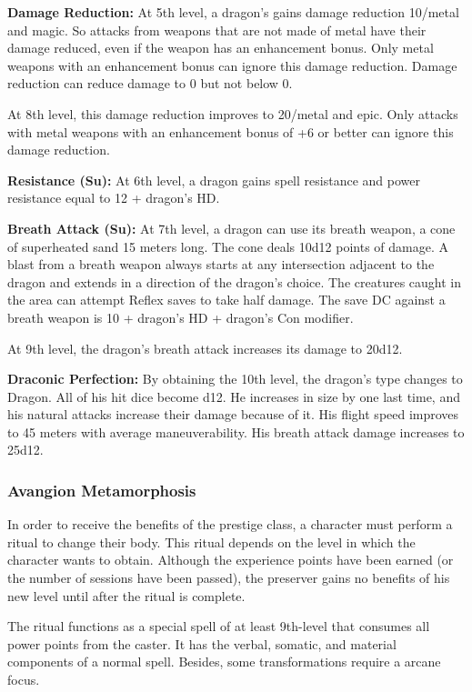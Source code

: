 {\textbf{Damage Reduction:} At 5th level, a dragon's gains damage reduction 10/metal and magic. So attacks from weapons that are not made of metal have their damage reduced, even if the weapon has an enhancement bonus. Only metal weapons with an enhancement bonus can ignore this damage reduction. Damage reduction can reduce damage to 0 but not below 0.

At 8th level, this damage reduction improves to 20/metal and epic. Only attacks with metal weapons with an enhancement bonus of +6 or better can ignore this damage reduction.

\textbf{Resistance (Su):} At 6th level, a dragon gains spell resistance and power resistance equal to 12 + dragon's HD.

\textbf{Breath Attack (Su):} At 7th level, a dragon can use its breath weapon, a cone of superheated sand 15 meters long. The cone deals 10d12 points of damage. A blast from a breath weapon always starts at any intersection adjacent to the dragon and extends in a direction of the dragon's choice. The creatures caught in the area can attempt Reflex saves to take half damage. The save DC against a breath weapon is 10 + dragon's HD + dragon's Con modifier.

At 9th level, the dragon's breath attack increases its damage to 20d12.

\textbf{Draconic Perfection:} By obtaining the 10th level, the dragon's type changes to Dragon. All of his hit dice become d12. He increases in size by one last time, and his natural attacks increase their damage because of it. His flight speed improves to 45 meters with average maneuverability. His breath attack damage increases to 25d12.

\subsubsection{Avangion Metamorphosis}
\label{Avangion Metamorphosis}

In order to receive the benefits of the prestige class, a character must perform a ritual to change their body. This ritual depends on the level in which the character wants to obtain. Although the experience points have been earned (or the number of sessions have been passed), the preserver gains no benefits of his new level until after the ritual is complete.

The ritual functions as a special spell of at least 9th-level that consumes all power points from the caster. It has the verbal, somatic, and material components of a normal spell. Besides, some transformations require a arcane focus.

}
